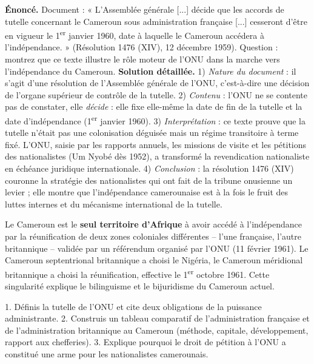 \documentclass[11pt]{article}
\newcommand{\cle}[1]{{\popxbold\color{popdark}#1}}
\begin{document}
\begin{exoresolu}
\textbf{Énoncé.} Document : « L'Assemblée générale [...] décide que les accords de tutelle concernant le Cameroun sous administration française [...] cesseront d'être en vigueur le 1\textsuperscript{er} janvier 1960, date à laquelle le Cameroun accédera à l'indépendance. » (Résolution 1476 (XIV), 12 décembre 1959). Question : montrez que ce texte illustre le rôle moteur de l'ONU dans la marche vers l'indépendance du Cameroun.
\tcblower
\textbf{Solution détaillée.} 1) \emph{Nature du document} : il s'agit d'une résolution de l'Assemblée générale de l'ONU, c'est-à-dire une décision de l'organe supérieur de contrôle de la tutelle. 2) \emph{Contenu} : l'ONU ne se contente pas de constater, elle \emph{décide} : elle fixe elle-même la date de fin de la tutelle et la date d'indépendance (1\textsuperscript{er} janvier 1960). 3) \emph{Interprétation} : ce texte prouve que la tutelle n'était pas une colonisation déguisée mais un régime transitoire à terme fixé. L'ONU, saisie par les rapports annuels, les missions de visite et les pétitions des nationalistes (Um Nyobé dès 1952), a transformé la revendication nationaliste en échéance juridique internationale. 4) \emph{Conclusion} : la résolution 1476 (XIV) couronne la stratégie des nationalistes qui ont fait de la tribune onusienne un levier ; elle montre que l'indépendance camerounaise est à la fois le fruit des luttes internes et du mécanisme international de la tutelle.
\end{exoresolu}

\begin{savaistu}[Le savais-tu ?]
Le Cameroun est le \textbf{seul territoire d'Afrique} à avoir accédé à l'indépendance par la \cle{réunification} de deux zones coloniales différentes -- l'une française, l'autre britannique -- validée par un \cle{référendum organisé par l'ONU} (11 février 1961). Le Cameroun septentrional britannique a choisi le Nigéria, le Cameroun méridional britannique a choisi la réunification, effective le 1\textsuperscript{er} octobre 1961. Cette singularité explique le bilinguisme et le bijuridisme du Cameroun actuel.
\end{savaistu}

\begin{exercice}
1. Définis la tutelle de l'ONU et cite deux obligations de la puissance administrante. 2. Construis un tableau comparatif de l'administration française et de l'administration britannique au Cameroun (méthode, capitale, développement, rapport aux chefferies). 3. Explique pourquoi le droit de pétition à l'ONU a constitué une arme pour les nationalistes camerounais.
\end{exercice}
\end{document}
